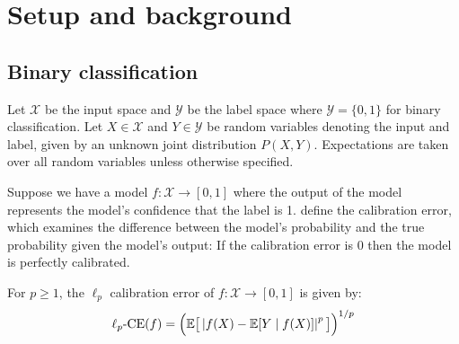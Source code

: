 \section{Setup and background}
\label{sec:formulation}

\newcommand{\lpce}[0]{\ensuremath{\ell_p\textup{-CE}}}
\newcommand{\ltwoce}[0]{\ensuremath{\ell_2\textup{-CE}}}
\newcommand{\lsquared}[0]{\ensuremath{L^2}}
\newcommand{\squaredce}[0]{\ensuremath{L^2\textup{-CE}}}
\newcommand{\topsquaredce}[0]{\ensuremath{L^2\textup{-TCE}}}
\newcommand{\margsquaredce}[0]{\ensuremath{L^2\textup{-MCE}}}
\newcommand{\mse}[0]{\ensuremath{\textup{MSE}}}

\subsection{Binary classification}

Let $\mathcal{X}$ be the input space and $\mathcal{Y}$ be the label space where $\mathcal{Y} = \{0, 1\}$ for binary classification.
Let $X \in \mathcal{X}$ and $Y \in \mathcal{Y}$ be random variables denoting the input and label, given by an unknown joint distribution  $P(X, Y)$. Expectations are taken over all random variables unless otherwise specified.

Suppose we have a model $f : \mathcal{X} \to [0, 1]$ where the  output of the model represents the model's confidence that the label is 1.  define the calibration error, which examines the difference between the model's probability and the true probability given the model's output:  If the calibration error is $0$ then the model is perfectly calibrated.

\begin{definition}
For $p \geq 1$, the $\ell_p$ calibration error of $f : \mathcal{X} \to [0, 1]$ is given by:
\begin{align}
\lpce(f) = \Big(\expect\big[ \left|f(X) - \expect[Y \mid f(X)] \right|^p \big] \Big)^{1/p}
\end{align}
\end{definition}


